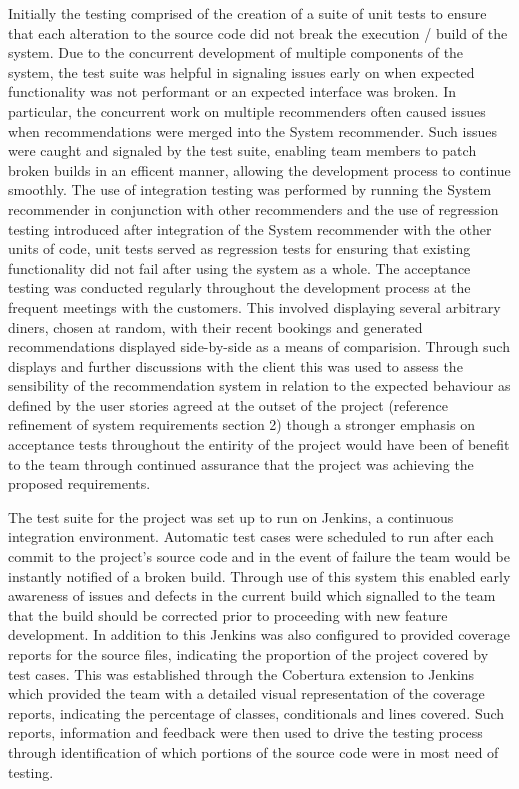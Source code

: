\documentclass{l3proj}
\begin{document}
Initially the testing comprised of the creation of a suite of unit tests to ensure that each alteration to the source code did not break the execution / build of the system.
Due to the concurrent development of multiple components of the system, the test suite was helpful in signaling issues early on when expected functionality was not performant or an expected interface was broken. In particular, the concurrent work on multiple recommenders often caused issues when recommendations were merged into the System recommender. Such issues were caught and signaled by the test suite, enabling team members to patch broken builds in an efficent manner, allowing the development process to continue smoothly. The use of integration testing was performed by running the System recommender in conjunction with other recommenders and the use of regression testing introduced after integration of the System recommender with the other units of code, unit tests served as regression tests for ensuring that existing functionality did not fail after using the system as a whole. The acceptance testing was conducted regularly throughout the development process at the frequent meetings with the customers. This involved displaying several arbitrary diners, chosen at random, with their recent bookings and generated recommendations displayed side-by-side as a means of comparision. Through such displays and further discussions with the client this was used to assess the sensibility of the recommendation system in relation to the expected behaviour as defined by the user stories agreed at the outset of the project (reference refinement of system requirements section 2) though a stronger emphasis on acceptance tests throughout the entirity of the project would have been of benefit to the team through continued assurance that the project was achieving the proposed requirements.

The test suite for the project was set up to run on Jenkins, a continuous integration environment. Automatic test cases were scheduled to run after each commit to the project's source code and in the event of failure the team would be instantly notified of a broken build. Through use of this system this enabled early awareness of issues and defects in the current build which signalled to the team that the build should be corrected prior to proceeding with new feature development. In addition to this Jenkins was also configured to provided coverage reports for the source files, indicating the proportion of the project covered by test cases. This was established through the Cobertura extension to Jenkins which provided the team with a detailed visual representation of the coverage reports, indicating the percentage of classes, conditionals and lines covered. Such reports, information and feedback were then used to drive the testing process through identification of which portions of the source code were in most need of testing.
\end{document}
